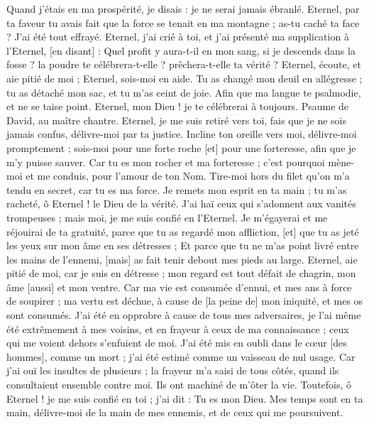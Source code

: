 \begin{multicols}{2}
Quand j'étais en ma prospérité, je disais : je ne serai jamais ébranlé.
Eternel, par ta faveur tu avais fait que la force se tenait en ma montagne ; as-tu caché ta face ? J'ai été tout effrayé.
Eternel, j'ai crié à toi, et j'ai présenté ma supplication à l'Eternel, [en disant] :
Quel profit y aura-t-il en mon sang, si je descends dans la fosse ? la poudre te célébrera-t-elle ? prêchera-t-elle ta vérité ?
Eternel, écoute, et aie pitié de moi ; Eternel, sois-moi en aide.
Tu as changé mon deuil en allégresse ; tu as détaché mon sac, et tu m'as ceint de joie.
Afin que ma langue te psalmodie, et ne se taise point. Eternel, mon Dieu ! je te célébrerai à toujours.
\VerseOne{}Psaume de David, au maître chantre. Eternel, je me suis retiré vers toi, fais que je ne sois jamais confus, délivre-moi par ta justice.
Incline ton oreille vers moi, délivre-moi promptement ; sois-moi pour une forte roche [et] pour une forteresse, afin que je m'y puisse sauver.
Car tu es mon rocher et ma forteresse ; c'est pourquoi mène-moi et me conduis, pour l'amour de ton Nom.
Tire-moi hors du filet qu'on m'a tendu en secret, car tu es ma force.
Je remets mon esprit en ta main ; tu m'as racheté, ô Eternel ! le Dieu de la vérité.
J'ai haï ceux qui s'adonnent aux vanités trompeuses ; mais moi, je me suis confié en l'Eternel.
Je m'égayerai et me réjouirai de ta gratuité, parce que tu as regardé mon affliction, [et] que tu as jeté les yeux sur mon âme en ses détresses ;
Et parce que tu ne m'as point livré entre les mains de l'ennemi, [mais] as fait tenir debout mes pieds au large.
Eternel, aie pitié de moi, car je suis en détresse ; mon regard est tout défait de chagrin, mon âme [aussi] et mon ventre.
Car ma vie est consumée d'ennui, et mes ans à force de soupirer ; ma vertu est déchue, à cause de [la peine de] mon iniquité, et mes os sont consumés.
J'ai été en opprobre à cause de tous mes adversaires, je l'ai même été extrêmement à mes voisins, et en frayeur à ceux de ma connaissance ; ceux qui me voient dehors s'enfuient de moi.
J'ai été mis en oubli dans le cœur [des hommes], comme un mort ; j'ai été estimé comme un vaisseau de nul usage.
Car j'ai ouï les insultes de plusieurs ; la frayeur m'a saisi de tous côtés, quand ils consultaient ensemble contre moi. Ils ont machiné de m'ôter la vie.
Toutefois, ô Eternel ! je me suis confié en toi ; j'ai dit : Tu es mon Dieu.
Mes temps sont en ta main, délivre-moi de la main de mes ennemis, et de ceux qui me poursuivent.

\end{multicols}
